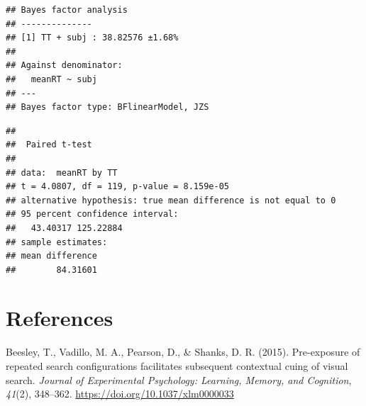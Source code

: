 \documentclass[
  man]{apa6}
\newlength{\cslhangindent}
\newlength{\cslentryspacingunit} %
\newenvironment{CSLReferences}[2] %
 {%
  \setlength{\parindent}{0pt}
  \ifodd #1
  \let\oldpar\par
  \def\par{\hangindent=\cslhangindent\oldpar}
  \fi
  \setlength{\parskip}{#2\cslentryspacingunit}
 }%
 {}
\begin{document}
\begin{verbatim}
## Bayes factor analysis
## --------------
## [1] TT + subj : 38.82576 ±1.68%
## 
## Against denominator:
##   meanRT ~ subj 
## ---
## Bayes factor type: BFlinearModel, JZS
\end{verbatim}

\begin{verbatim}
## 
##  Paired t-test
## 
## data:  meanRT by TT
## t = 4.0807, df = 119, p-value = 8.159e-05
## alternative hypothesis: true mean difference is not equal to 0
## 95 percent confidence interval:
##   43.40317 125.22884
## sample estimates:
## mean difference 
##        84.31601
\end{verbatim}

\newpage

\hypertarget{references}{%
\section*{References}\label{references}}

\hypertarget{refs}{}
\begin{CSLReferences}{1}{0}
\leavevmode{}%
Beesley, T., Vadillo, M. A., Pearson, D., \& Shanks, D. R. (2015). Pre-exposure of repeated search configurations facilitates subsequent contextual cuing of visual search. \emph{Journal of Experimental Psychology: Learning, Memory, and Cognition}, \emph{41}(2), 348--362. \url{https://doi.org/10.1037/xlm0000033}

\end{CSLReferences}
\end{document}
